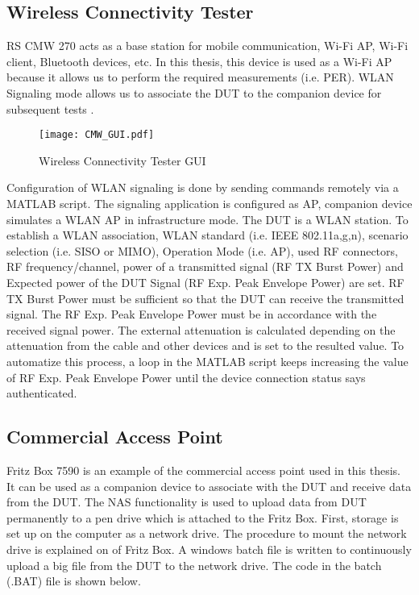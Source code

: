 \subsection{Wireless Connectivity Tester} \label{sec:cmw}
\acs{RS}\textregistered{} CMW 270 acts as a base station for mobile communication, Wi-Fi\texttrademark{} \acs{AP}, Wi-Fi\texttrademark{} client, Bluetooth\textregistered{} devices, etc. In this thesis, this device is used as a Wi-Fi\texttrademark{} \acs{AP} because it allows us to perform the required measurements (i.e. \acf{PER}). \acs{WLAN} Signaling mode allows us to associate the \acs{DUT} to the companion device for subsequent tests \cite{cmw}.

\begin{figure}[H]
\centering
\texttt{[image: CMW\_GUI.pdf]}
\caption{Wireless Connectivity Tester \acs{GUI}}
\label{fig:cmwGUI}
\end{figure}

Configuration of \acs{WLAN} signaling is done by sending commands remotely via a MATLAB\textregistered{} script.  The signaling application is configured as \acf{AP}, companion device simulates a \acs{WLAN} \acf{AP} in infrastructure mode. The \acs{DUT} is a \acs{WLAN} station. To establish a \acs{WLAN} association, \acs{WLAN} standard (i.e. \acs{IEEE} 802.11a,g,n), scenario selection (i.e. \acs{SISO} or \acs{MIMO}), Operation Mode (i.e. \acs{AP}), used \acs{RF} connectors, \acs{RF} frequency/channel, power of a transmitted signal (\acs{RF} TX Burst Power) and Expected power of the \acs{DUT} Signal (\acs{RF} Exp. Peak Envelope Power) are set. \acs{RF} TX Burst Power must be sufficient so that the \acs{DUT} can receive the transmitted signal. The \acs{RF} Exp. Peak Envelope Power must be in accordance with the received signal power. The external attenuation is calculated depending on the attenuation from the cable and other devices and is set to the resulted value. To automatize this process, a loop in the MATLAB\textregistered{} script keeps increasing the value of \acs{RF} Exp. Peak Envelope Power until the device connection status says authenticated.

\subsection{Commercial Access Point} \label{sec:golden}
Fritz Box 7590 is an example of the commercial access point used in this thesis. It can be used as a companion device to associate with the \acs{DUT} and receive data from the \acs{DUT}. The \acf{NAS} functionality is used to upload data from \acs{DUT} permanently to a pen drive which is attached to the Fritz Box. First, storage is set up on the computer as a network drive. The procedure to mount the network drive is explained on \cite{fritz} of Fritz Box. A windows batch file is written to continuously upload a big file from the \acs{DUT} to the network drive. The code in the batch (.BAT) file is shown below.

